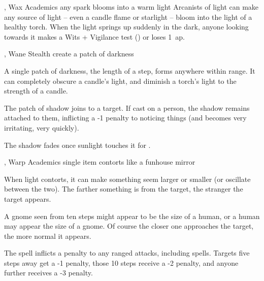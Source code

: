   {\mFire, \mAir}%
  {Wax}%
  {}%
  {Academics}%
  {any spark blooms into a warm light}%
  {
    Arcanists of light can make any source of light -- even a candle flame or starlight -- bloom into the light of a healthy torch.
    When the light springs up suddenly in the dark, anyone looking towards it makes a Wits + Vigilance test () or loses 1~\gls{ap}.
  }

  {\mFire, \mAir}%
  {Wane}%
  {}%
  {Stealth}%
  {create a patch of darkness}%
  {
    A single patch of darkness, the length of a step, forms anywhere within range.
    It can completely obscure a candle's light, and diminish a torch's light to the strength of a candle.

    The patch of shadow joins to a target.
    If cast on a person, the shadow remains attached to them, inflicting a -1 penalty to noticing things (and becomes very irritating, very quickly).

    The shadow fades once sunlight touches it for .
  }

  {\mFire, \mAir}%
  {Warp}%
  {}%
  {Academics}%
  {single item contorts like a funhouse mirror}%
  {
    When light contorts, it can make something seem larger or smaller (or oscillate between the two).
    The farther something is from the target, the stranger the target appears.

    A gnome seen from ten steps might appear to be the size of a human, or a human may appear the size of a gnome.
    Of course the closer one approaches the target, the more normal it appears.

    The spell inflicts a penalty to any ranged attacks, including spells.
    Targets five steps away get a -1 penalty, those 10 steps receive a -2 penalty, and anyone further receives a -3 penalty.
  }

